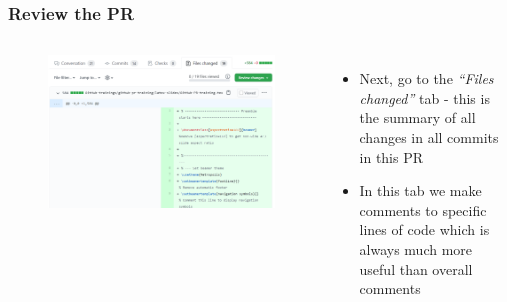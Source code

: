 \documentclass[aspectratio=169]{beamer} %
\begin{document}
\begin{frame}
	\frametitle{Review the PR}
	\begin{columns}[c]

		\vspace{-.75cm}
		\begin{figure}
			\centering
			\includegraphics[width=\textwidth]{./img/review-1.png}
		\end{figure}

		\begin{itemize}
			\setlength\itemsep{1.5em}
			\item Next, go to the \textit{``Files changed''} tab
			- this is the summary of all changes in all commits in this PR
			\item In this tab we make comments to specific lines of code which is always much more useful than overall comments
		\end{itemize}

	\end{columns}
\end{frame}
\end{document}
